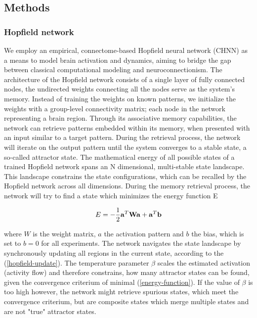 \documentclass{article}
\begin{document}
\subsection{Methods}\label{Methods}

\subsubsection{Hopfield network}\label{Hopfield network}

We employ an empirical, connectome-based Hopfield neural network (CHNN) as a means to model brain activation and dynamics, aiming to
bridge the gap between classical computational modeling and neuroconnectionism. The architecture of the Hopfield network
\citep{hopfield1982neural} consists of a single layer of fully connected nodes, the undirected weights connecting
all the nodes serve as the system's memory.
Instead of training the weights on known patterns, we initialize the weights with a group-level
connectivity matrix; each node in the network representing a brain region. Through its associative memory capabilities,
the network can retrieve patterns embedded within its memory, when presented with an input similar to a target
pattern. During the retrieval process, the network will iterate on the output pattern until the system converges to a
stable state, a so-called attractor state. The mathematical energy of all possible states of a trained Hopfield network
spans an N dimensional, multi-stable state landscape. This landscape constrains the state configurations, which can be
recalled by the Hopfield network across all dimensions. During the memory retrieval process, the network will try to
find a state which minimizes the energy function E

\begin{equation}
\label{energy-function}
E = - \frac{1}{2}  \bold{a}^{T} \bold{W} \bold{a} + \bold{a}^{T}\bold{b}
\end{equation}

where $W$ is the weight matrix, $a$ the activation pattern and $b$ the bias, which is set to $b = 0$ for all experiments.
The network navigates the state landscape by synchronously updating all regions in the current state, according to the
(\ref{hopfield-update}). The temperature parameter $\beta$ scales the estimated activation (activity flow)
\citep{cole2016activity}and therefore constrains, how many attractor states can be found, given the convergence
criterium of minimal (\ref{energy-function}).
If the value of $\beta$ is too high however, the network might retrieve spurious states,
which meet the convergence criterium, but are composite states which merge multiple states and are not "true"
attractor states.
\end{document}
